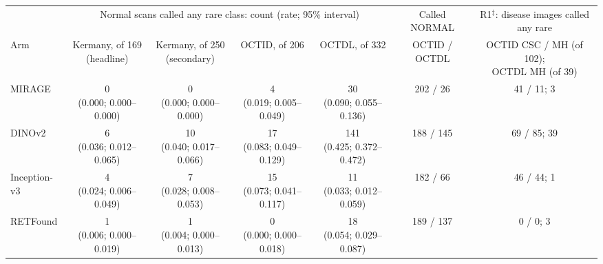 \begin{tabular}{@{}lcccccc@{}}
\toprule
 & \multicolumn{4}{c}{Normal scans called any rare class: count (rate; 95\% interval)} & Called NORMAL & R1$^\ddagger$: disease images called any rare \\
\cmidrule(lr){2-5}
Arm & \makecell{Kermany, of 169\\(headline)} & \makecell{Kermany, of 250\\(secondary)} & OCTID, of 206 & OCTDL, of 332 & OCTID / OCTDL & \makecell{OCTID CSC / MH (of 102);\\OCTDL MH (of 39)} \\
\midrule
MIRAGE & \makecell{0\\{\scriptsize (0.000; 0.000--0.000)}} & \makecell{0\\{\scriptsize (0.000; 0.000--0.000)}} & \makecell{4\\{\scriptsize (0.019; 0.005--0.049)}} & \makecell{30\\{\scriptsize (0.090; 0.055--0.136)}} & 202 / 26 & 41 / 11; 3 \\
DINOv2 & \makecell{6\\{\scriptsize (0.036; 0.012--0.065)}} & \makecell{10\\{\scriptsize (0.040; 0.017--0.066)}} & \makecell{17\\{\scriptsize (0.083; 0.049--0.129)}} & \makecell{141\\{\scriptsize (0.425; 0.372--0.472)}} & 188 / 145 & 69 / 85; 39 \\
Inception-v3 & \makecell{4\\{\scriptsize (0.024; 0.006--0.049)}} & \makecell{7\\{\scriptsize (0.028; 0.008--0.053)}} & \makecell{15\\{\scriptsize (0.073; 0.041--0.117)}} & \makecell{11\\{\scriptsize (0.033; 0.012--0.059)}} & 182 / 66 & 46 / 44; 1 \\
RETFound & \makecell{1\\{\scriptsize (0.006; 0.000--0.019)}} & \makecell{1\\{\scriptsize (0.004; 0.000--0.013)}} & \makecell{0\\{\scriptsize (0.000; 0.000--0.018)}} & \makecell{18\\{\scriptsize (0.054; 0.029--0.087)}} & 189 / 137 & 0 / 0; 3 \\
\bottomrule
\end{tabular}

